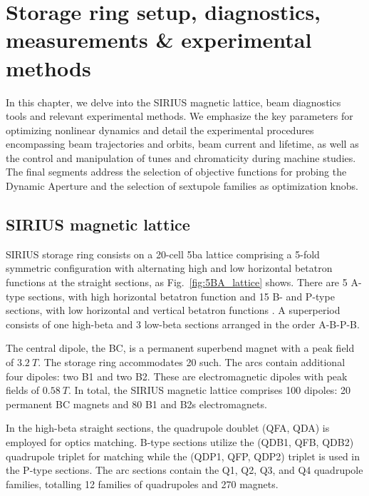\chapter{Storage ring setup, diagnostics, measurements \& experimental methods}
In this chapter, we delve into the SIRIUS magnetic lattice, beam diagnostics tools and relevant experimental methods. We emphasize the key parameters  for optimizing nonlinear dynamics and detail the experimental procedures encompassing beam trajectories and orbits, beam current and lifetime, as well as the control and manipulation of tunes and chromaticity during machine studies. The final segments address the selection of objective functions for probing the Dynamic Aperture and the selection of sextupole families as optimization knobs.

\section{SIRIUS magnetic lattice}
\label{sec:mag_latt}
SIRIUS storage ring consists on a 20-cell \gls*{5ba} lattice comprising a 5-fold symmetric configuration with alternating high and low horizontal betatron functions at the straight sections, as Fig.~\ref{fig:5BA_lattice} shows. There are 5 A-type sections, with high horizontal betatron function and 15 B- and P-type sections, with low horizontal and vertical betatron functions \cite{liu_new_2016}.
A superperiod consists of one high-beta and 3 low-beta sections arranged in the order A-B-P-B.

The central dipole, the BC, is a permanent superbend magnet with a peak field of $3.2~\unit{T}$. The storage ring accommodates 20 such. The arcs contain additional four dipoles: two B1 and two B2. These are electromagnetic dipoles with peak fields of $0.58~\unit{T}$. In total, the SIRIUS magnetic lattice comprises 100 dipoles: 20 permanent BC magnets and 80 B1 and B2s electromagnets.

In the high-beta straight sections, the quadrupole doublet (QFA, QDA) is employed for optics matching. B-type sections utilize the (QDB1, QFB, QDB2) quadrupole triplet for matching while the (QDP1, QFP, QDP2) triplet is used in the P-type sections. The arc sections contain the Q1, Q2, Q3, and Q4 quadrupole families, totalling 12 families of quadrupoles and 270 magnets.


